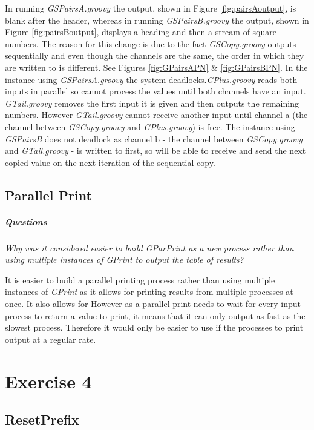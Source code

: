 \documentclass[10pt, a4paper]{article}
\begin{document}
	In running \textit{GSPairsA.groovy} the output, shown in Figure \ref{fig:pairsAoutput}, is blank after the header, whereas in running \textit{GSPairsB.groovy} the output, shown in Figure \ref{fig:pairsBoutput}, displays a heading and then a stream of square numbers. The reason for this change is due to the fact \textit{GSCopy.groovy} outputs sequentially and even though the channels are the same, the order in which they are written to is different. See Figures \ref{fig:GPairsAPN} \& \ref{fig:GPairsBPN}. In the instance using \textit{GSPairsA.groovy} the system deadlocks.\textit{GPlus.groovy} reads both inputs in parallel so cannot process the values until both channels have an input. \textit{GTail.groovy} removes the first input it is given and then outputs the remaining numbers. However \textit{GTail.groovy} cannot receive another input until channel a (the channel between \textit{GSCopy.groovy} and \textit{GPlus.groovy}) is free. The instance using \textit{GSPairsB} does not deadlock as channel b - the channel between \textit{GSCopy.groovy} and \textit{GTail.groovy} - is written to first, so will be able to receive and send the next copied value on the next iteration of the sequential copy.
	
	\subsection{Parallel Print}
	
	\subparagraph{Questions} \hfill
	
	\textit{Why was it considered easier to build GParPrint as a new process rather than using multiple instances of GPrint to output the table of results?}
	
	It is easier to build a parallel printing process rather than using multiple instances of \textit{GPrint} as it allows for printing results from multiple processes at once. It also allows for %
	However as a parallel print needs to wait for every input process to return a value to print, it means that it can only output as fast as the slowest process. Therefore it would only be easier to use if the processes to print output at a regular rate.
	
	\setcounter{section}{4}
	\section*{Exercise 4}
	
	\setcounter{subsection}{0}
	\subsection{ResetPrefix}
\end{document}
